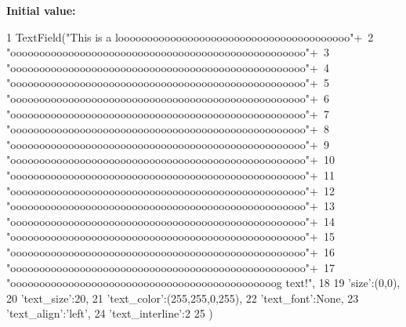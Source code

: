 {\bfseries \-Initial value\-:}
\begin{DoxyCode}
1 TextField("This is a loooooooooooooooooooooooooooooooooooooooo\n"+\
2                       "ooooooooooooooooooooooooooooooooooooooooooooooooooo\n"+\
3                       "ooooooooooooooooooooooooooooooooooooooooooooooooooo\n"+\
4                       "ooooooooooooooooooooooooooooooooooooooooooooooooooo\n"+\
5                       "ooooooooooooooooooooooooooooooooooooooooooooooooooo\n"+\
6                       "ooooooooooooooooooooooooooooooooooooooooooooooooooo\n"+\
7                       "ooooooooooooooooooooooooooooooooooooooooooooooooooo\n"+\
8                       "ooooooooooooooooooooooooooooooooooooooooooooooooooo\n"+\
9                       "ooooooooooooooooooooooooooooooooooooooooooooooooooo\n"+\
10                       "ooooooooooooooooooooooooooooooooooooooooooooooooooo\n"+\
11                       "ooooooooooooooooooooooooooooooooooooooooooooooooooo\n"+\
12                       "ooooooooooooooooooooooooooooooooooooooooooooooooooo\n"+\
13                       "ooooooooooooooooooooooooooooooooooooooooooooooooooo\n"+\
14                       "ooooooooooooooooooooooooooooooooooooooooooooooooooo\n"+\
15                       "ooooooooooooooooooooooooooooooooooooooooooooooooooo\n"+\
16                       "ooooooooooooooooooooooooooooooooooooooooooooooooooo\n"+\
17                       "oooooooooooooooooooooooooooooooooooooooooooooog text!",
18                       {
19                         'size':(0,0),
20                         'text_size':20,
21                         'text_color':(255,255,0,255),
22                         'text_font':None,
23                         'text_align':'left',
24                         'text_interline':2
25                       })
\end{DoxyCode}
